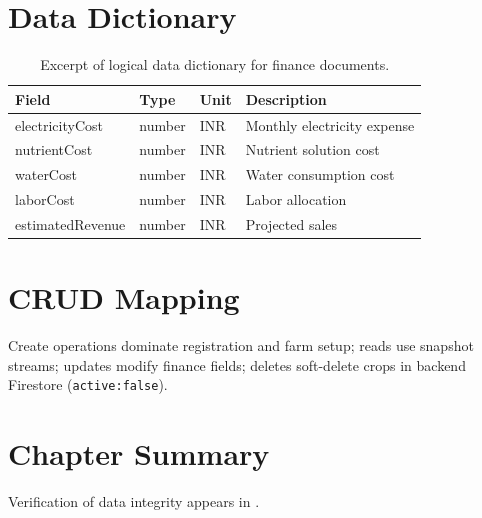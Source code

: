 \section{Data Dictionary}
\begin{table}[htbp]
\centering
\caption{Excerpt of logical data dictionary for finance documents.}
\label{tab:data_dictionary}
\begin{tabular}{@{}llll@{}}
\toprule
\textbf{Field} & \textbf{Type} & \textbf{Unit} & \textbf{Description} \\
\midrule
electricityCost & number & INR & Monthly electricity expense \\
nutrientCost & number & INR & Nutrient solution cost \\
waterCost & number & INR & Water consumption cost \\
laborCost & number & INR & Labor allocation \\
estimatedRevenue & number & INR & Projected sales \\
\bottomrule
\end{tabular}
\end{table}

\section{CRUD Mapping}
Create operations dominate registration and farm setup; reads use snapshot streams; updates modify finance fields; deletes soft-delete crops in backend Firestore (\texttt{active:false}).

\section{Chapter Summary}
Verification of data integrity appears in .
